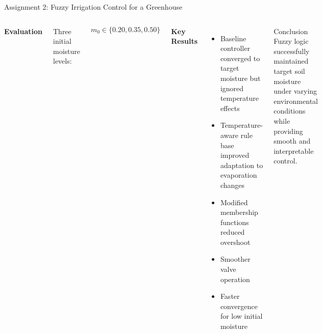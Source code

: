 \documentclass[10pt]{beamer}
\begin{document}
\begin{frame}{Assignment 2: Fuzzy Irrigation Control for a Greenhouse}
\begin{columns}[T]

\textbf{Evaluation}

Three initial moisture levels:

\[
m_0 \in \{0.20, 0.35, 0.50\}
\]

\vspace{0.3cm}

\textbf{Key Results}

\begin{itemize}
    \item Baseline controller converged to target moisture but ignored temperature effects
    \item Temperature-aware rule base improved adaptation to evaporation changes
    \item Modified membership functions reduced overshoot
    \item Smoother valve operation
    \item Faster convergence for low initial moisture
\end{itemize}

\vspace{0.4cm}

\begin{block}{Conclusion}
Fuzzy logic successfully maintained target soil moisture under varying
environmental conditions while providing smooth and interpretable control.
\end{block}

\end{columns}

\end{frame}
\end{document}
